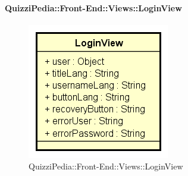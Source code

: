 \paragraph{QuizziPedia::Front-End::Views::LoginView}
\begin{figure} [ht]
	\centering
	\includegraphics[scale=0.80]{UML/Classi/Front-End/QuizziPedia_Front-end_Views_LoginView.png}
	\caption{QuizziPedia::Front-End::Views::LoginView}
\end{figure} \FloatBarrier
